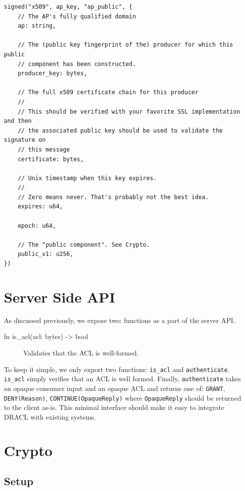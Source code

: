 \documentclass[pdftex,12pt,a4papaer,twoside,notitlepage]{report}
\begin{document}
\begin{lstlisting}[caption={AP Public Component},float,floatplacement=H]
signed("x509", ap_key, "ap_public", {     
    // The AP's fully qualified domain
    ap: string,

    // The (public key fingerprint of the) producer for which this public
    // component has been constructed.
    producer_key: bytes,

    // The full x509 certificate chain for this producer
    //
    // This should be verified with your favorite SSL implementation and then
    // the associated public key should be used to validate the signature on
    // this message
    certificate: bytes,

    // Unix timestamp when this key expires.
    //
    // Zero means never. That's probably not the best idea.
    expires: u64,

    epoch: u64,

    // The "public component". See Crypto.
    public_v1: u256,
})
\end{lstlisting}

\section{Server Side API}

As discussed previously, we expose two: functions as a part of the server API.

\begin{description}
\item [fn is\_acl(acl: bytes) -> bool] Validates that the ACL is well-formed.
\end{description}

To keep it simple, we only export two functions: \verb=is_acl= and \verb=authenticate=. \verb=is_acl= simply
verifies that an ACL is well formed. 
Finally, \verb=authenticate= takes an opaque
consumer input and an opaque ACL and returns one of: \verb=GRANT=,
\verb=DENY(Reason)=, \verb=CONTINUE(OpaqueReply)= where \verb=OpaqueReply=
should be returned to the client as-is. This minimal interface should make it
easy to integrate DRACL with existing systems.



\section{Crypto}

\subsection{Setup}
\end{document}
